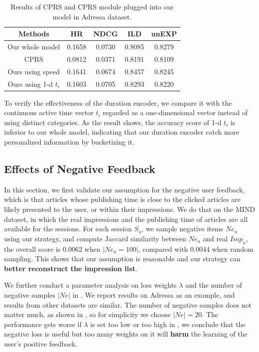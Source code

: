 \begin{table}[th]\setlength{\tabcolsep}{8pt}
  \caption{Results of CPRS and CPRS module plugged into our model in Adressa dataset.}
  \label{tb:CPRS}
  \centering
  \renewcommand{\arraystretch}{1.3}
  \begin{tabular}{|c|cccc|}
    \hline
    Methods  & HR & NDCG & ILD & unEXP\\
    \hline
    Our whole model & 0.1658 & 0.0730 & 0.8085 & 0.8279\\
    \hline
    CPRS & 0.0812 & 0.0371 & 0.8191 & 0.8109\\
    Ours using speed & 0.1641 & 0.0674 & 0.8457 & 0.8245\\
    Ours using 1-d $t_i$ & 0.1603 & 0.0705 & 0.8293 & 0.8220\\
    \hline
  \end{tabular}
\end{table}

To verify the effectiveness of the duration encoder, we compare it with the continuous active time vector $t_i$ regarded as a one-dimensional vector instead of using distinct categories. As the result shows, the accuracy score of 1-d $t_i$ is inferior to our whole model, indicating that our duration encoder catch more personalized information by bucketizing it.

\subsection{Effects of Negative Feedback}
In this section, we first validate our assumption for the negative user feedback,
which is that articles whose publishing time is close to the clicked articles are
likely presented to the user, or within their impressions.
We do that on the MIND dataset, in which the real impressions and the
publishing time of articles are all available for the sessions. 
For each session $S_u$, we sample negative items $Ne_u$ using our strategy, and compute Jaccard similarity between $Ne_u$ and real $Imp_u$, the overall score is 0.0062 when $|Ne_u=100|$, compared with 0.0044 when random sampling.
This shows that our assumption is reasonable and our strategy can \textbf{better reconstruct the impression list}.

We further conduct a parameter analysis on loss weights $\lambda$ and the number of negative samples $|Ne|$ 
in . We report results on Adressa as an example, and results from other datasets are similar. 
The number of negative samples does not matter much, as shown in , 
so for simplicity we choose $|Ne|=20$. The performance gets worse if $\lambda$ is set too low or too 
high in , we conclude that the negative loss is useful but too many weights on it will \textbf{harm} the learning of the user's positive feedback.

